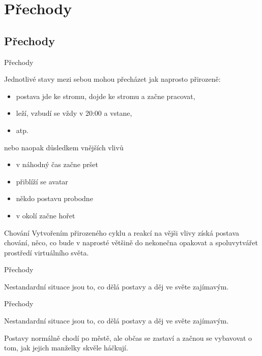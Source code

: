 ﻿\documentclass[a4paper]{beamer}
\begin{document}
\section{Přechody}
\subsection*{Přechody}

\begin{frame}{Přechody}
    
    Jednotlivé stavy mezi sebou mohou přecházet jak naprosto přirozeně:
    
    \begin{itemize}
        \item postava jde ke stromu, dojde ke stromu a začne pracovat, 
        \item leží, vzbudí se vždy v 20:00 a vstane, 
        \item atp.
    \end{itemize} 
    nebo naopak důsledkem vnějších vlivů
    \begin{itemize}
        \item v náhodný čas začne pršet
        \item přiblíží se avatar
        \item někdo postavu probodne
        \item v okolí začne hořet
    \end{itemize}
     
    
     \vfill

    \begin{exampleblock}{Chování}
            Vytvořením přirozeného cyklu a reakcí na vějši vlivy získá postava chování, něco, co bude v naprosté většině do nekonečna opakovat a spoluvytvářet  prostředí virtuálního světa.
    \end{exampleblock}

        

    
\end{frame}

\begin{frame}{Přechody}
    
 

    \vfill
    Nestandardní situace jsou to, co dělá postavy a děj ve světe zajímavým. 
    \vfill
    
\end{frame}

\begin{frame}{Přechody}
    
 

    \vfill
    Nestandardní situace jsou to, co dělá postavy a děj ve světe zajímavým. 
    \vfill

    Postavy normálně chodí po městě, ale občas se zastaví a začnou se vybavovat o tom, jak jejich manželky skvěle háčkují. 

    \vfill
    
\end{frame}
\end{document}
